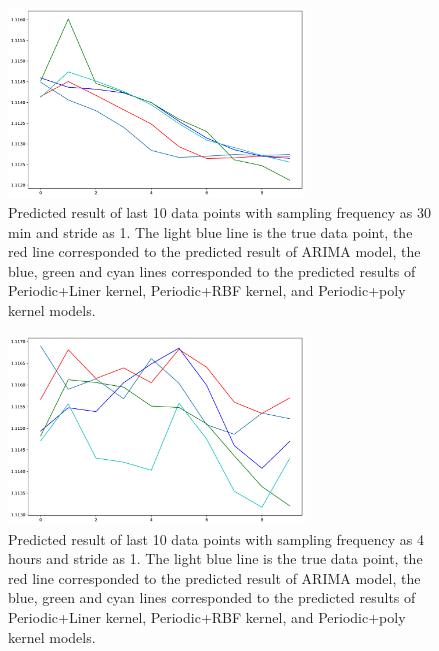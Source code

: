 \documentclass[12pt]{article}
\begin{document}
\begin{figure}[H]
\centering 
\includegraphics[width=0.7\textwidth]{fig/section3/m30_h1_all_together.png}
\centering 
\caption{Predicted result of last 10 data points with sampling frequency as 30 min and stride as 1. The light blue line is the true data point, the red line corresponded to the predicted result of ARIMA model, the blue, green and cyan lines corresponded to the predicted results of Periodic+Liner kernel, Periodic+RBF kernel, and Periodic+poly kernel models.}
\label{fig:grammar}
\end{figure}

\begin{figure}[H]
\centering 
\includegraphics[width=0.7\textwidth]{fig/section3/h4_h1_all_together.png}
\centering 
\caption{Predicted result of last 10 data points with sampling frequency as 4 hours and stride as 1. The light blue line is the true data point, the red line corresponded to the predicted result of ARIMA model, the blue, green and cyan lines corresponded to the predicted results of Periodic+Liner kernel, Periodic+RBF kernel, and Periodic+poly kernel models.}
\label{fig:grammar}
\end{figure}
\end{document}
